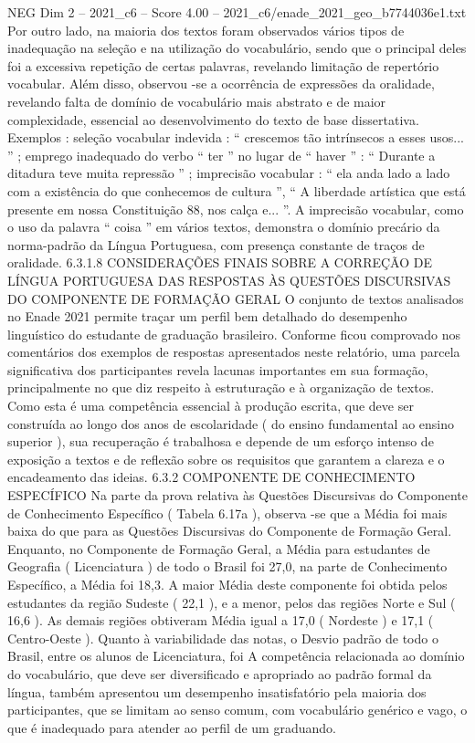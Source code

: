 \begin{textsample}{NEG Dim 2 – 2021\_c6 – Score 4.00 – 2021\_c6/enade\_2021\_geo\_b7744036e1.txt}
Por outro lado, na maioria dos textos foram observados vários tipos de inadequação na seleção e na utilização do vocabulário, sendo que o principal deles foi a excessiva repetição de certas palavras, revelando limitação de repertório vocabular.
Além disso, observou -se a ocorrência de expressões da oralidade, revelando falta de domínio de vocabulário mais abstrato e de maior complexidade, essencial ao desenvolvimento do texto de base dissertativa.
Exemplos : seleção vocabular indevida : “ crescemos tão intrínsecos a esses usos... ” ; emprego inadequado do verbo “ ter ” no lugar de “ haver ” : “ Durante a ditadura teve muita repressão ” ; imprecisão vocabular : “ ela anda lado a lado com a existência do que conhecemos de cultura ”, “ A liberdade artística que está presente em nossa Constituição 88, nos calça e... ”.
A imprecisão vocabular, como o uso da palavra “ coisa ” em vários textos, demonstra o domínio precário da norma-padrão da Língua Portuguesa, com presença constante de traços de oralidade. 6.3.1.8 CONSIDERAÇÕES FINAIS SOBRE A CORREÇÃO DE LÍNGUA PORTUGUESA DAS RESPOSTAS ÀS QUESTÕES DISCURSIVAS DO COMPONENTE DE FORMAÇÃO GERAL O conjunto de textos analisados no Enade 2021 permite traçar um perfil bem detalhado do desempenho linguístico do estudante de graduação brasileiro.
Conforme ficou comprovado nos comentários dos exemplos de respostas apresentados neste relatório, uma parcela significativa dos participantes revela lacunas importantes em sua formação, principalmente no que diz respeito à estruturação e à organização de textos.
Como esta é uma competência essencial à produção escrita, que deve ser construída ao longo dos anos de escolaridade ( do ensino fundamental ao ensino superior ), sua recuperação é trabalhosa e depende de um esforço intenso de exposição a textos e de reflexão sobre os requisitos que garantem a clareza e o encadeamento das ideias. 6.3.2 COMPONENTE DE CONHECIMENTO ESPECÍFICO Na parte da prova relativa às Questões Discursivas do Componente de Conhecimento Específico ( Tabela 6.17a ), observa -se que a Média foi mais baixa do que para as Questões Discursivas do Componente de Formação Geral.
Enquanto, no Componente de Formação Geral, a Média para estudantes de Geografia ( Licenciatura ) de todo o Brasil foi 27,0, na parte de Conhecimento Específico, a Média foi 18,3.
A maior Média deste componente foi obtida pelos estudantes da região Sudeste ( 22,1 ), e a menor, pelos das regiões Norte e Sul ( 16,6 ).
As demais regiões obtiveram Média igual a 17,0 ( Nordeste ) e 17,1 ( Centro-Oeste ).
Quanto à variabilidade das notas, o Desvio padrão de todo o Brasil, entre os alunos de Licenciatura, foi A competência relacionada ao domínio do vocabulário, que deve ser diversificado e apropriado ao padrão formal da língua, também apresentou um desempenho insatisfatório pela maioria dos participantes, que se limitam ao senso comum, com vocabulário genérico e vago, o que é inadequado para atender ao perfil de um graduando.

\end{textsample}
